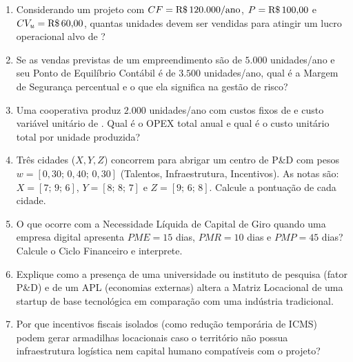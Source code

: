 \begin{enumerate}[leftmargin=1.6em, itemsep=5pt]
  \item Considerando um projeto com $CF = \text{R\$\,}{120.000/\text{ano}}$, $P = \text{R\$\,}{100{,}00}$ e $CV_u = \text{R\$\,}{60{,}00}$, quantas unidades devem ser vendidas para atingir um lucro operacional alvo de ? \espacoResolucao[1.6cm]
  \item Se as vendas previstas de um empreendimento são de $5.000$ unidades/ano e seu Ponto de Equilíbrio Contábil é de $3.500$ unidades/ano, qual é a Margem de Segurança percentual e o que ela significa na gestão de risco? \espacoResolucao[1.5cm]
  \item Uma cooperativa produz $2.000$ unidades/ano com custos fixos de  e custo variável unitário de . Qual é o OPEX total anual e qual é o custo unitário total por unidade produzida? \espacoResolucao[1.5cm]
  \item Três cidades ($X, Y, Z$) concorrem para abrigar um centro de P\&D com pesos $w = [0{,}30;\, 0{,}40;\, 0{,}30]$ (Talentos, Infraestrutura, Incentivos). As notas são: $X=[7;\, 9;\, 6]$, $Y=[8;\, 8;\, 7]$ e $Z=[9;\, 6;\, 8]$. Calcule a pontuação de cada cidade. \espacoResolucao[1.8cm]
  \item O que ocorre com a Necessidade Líquida de Capital de Giro quando uma empresa digital apresenta $PME = 15$ dias, $PMR = 10$ dias e $PMP = 45$ dias? Calcule o Ciclo Financeiro e interprete. \espacoResolucao[1.5cm]
  \item Explique como a presença de uma universidade ou instituto de pesquisa (fator P\&D) e de um APL (economias externas) altera a Matriz Locacional de uma startup de base tecnológica em comparação com uma indústria tradicional. \espacoResolucao[1.5cm]
  \item Por que incentivos fiscais isolados (como redução temporária de ICMS) podem gerar armadilhas locacionais caso o território não possua infraestrutura logística nem capital humano compatíveis com o projeto? \espacoResolucao[1.5cm]
\end{enumerate}


